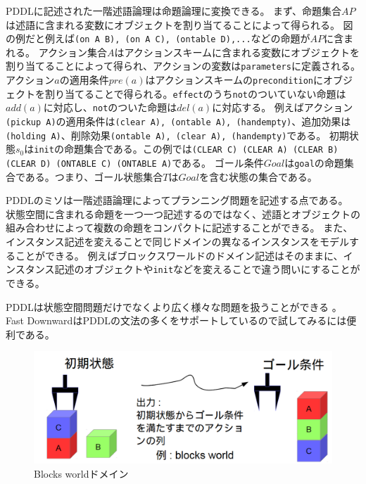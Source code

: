 PDDLに記述された一階述語論理は命題論理に変換できる。
まず、命題集合$AP$は述語に含まれる変数にオブジェクトを割り当てることによって得られる。
図の例だと例えば\texttt{(on A B), (on A C), (ontable D),...}などの命題が$AP$に含まれる。
アクション集合$A$はアクションスキームに含まれる変数にオブジェクトを割り当てることによって得られ、アクションの変数は\texttt{parameters}に定義される。
アクション$a$の適用条件$pre(a)$はアクションスキームの\texttt{precondition}にオブジェクトを割り当てることで得られる。\texttt{effect}のうち\texttt{not}のついていない命題は$add(a)$に対応し、\texttt{not}のついた命題は$del(a)$に対応する。
例えばアクション\texttt{(pickup A)}の適用条件は{\texttt{(clear A), (ontable A), (handempty)}}、追加効果は{\texttt{(holding A)}}、削除効果{\texttt{(ontable A), (clear A), (handempty)}}である。
初期状態$s_0$は\texttt{init}の命題集合である。この例では{\texttt{(CLEAR C) (CLEAR A) (CLEAR B) (CLEAR D) (ONTABLE C) (ONTABLE A)}}である。
ゴール条件$Goal$は\texttt{goal}の命題集合である。つまり、ゴール状態集合$T$は$Goal$を含む状態の集合である。

PDDLのミソは一階述語論理によってプランニング問題を記述する点である。
状態空間に含まれる命題を一つ一つ記述するのではなく、述語とオブジェクトの組み合わせによって複数の命題をコンパクトに記述することができる。
また、インスタンス記述を変えることで同じドメインの異なるインスタンスをモデルすることができる。
例えばブロックスワールドのドメイン記述はそのままに、インスタンス記述のオブジェクトや\texttt{init}などを変えることで違う問いにすることができる。

PDDLは状態空間問題だけでなくより広く様々な問題を扱うことができる \cite{aeronautiques1998pddl,fox2003pddl2}。
Fast DownwardはPDDLの文法の多くをサポートしているので試してみるには便利である。

\begin{figure}
\includegraphics[width=0.8\linewidth]{./figures/blocks-image.png}
\caption{Blocks worldドメイン}
\label{fig:blocks-world}
\end{figure}

